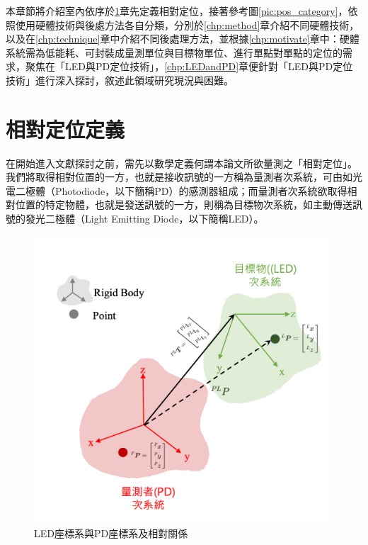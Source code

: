 本章節將介紹室內依序於\ref{chp:relative}章先定義相對定位，接著參考圖\ref{pic:pos_category}，依照使用硬體技術與後處方法各自分類，分別於\ref{chp:method}章介紹不同硬體技術，以及在\ref{chp:technique}章中介紹不同後處理方法，並根據\ref{chp:motivate}章中：硬體系統需為低能耗、可封裝成量測單位與目標物單位、進行單點對單點的定位的需求，聚焦在「LED與PD定位技術」，\ref{chp:LEDandPD}章便針對「LED與PD定位技術」進行深入探討，敘述此領域研究現況與困難。


   





\section{相對定位定義}
\label{chp:relative}

    
    在開始進入文獻探討之前，需先以數學定義何謂本論文所欲量測之「相對定位」。我們將取得相對位置的一方，也就是接收訊號的一方稱為量測者次系統，可由如光電二極體（Photodiode，以下簡稱PD）的感測器組成；而量測者次系統欲取得相對位置的特定物體，也就是發送訊號的一方，則稱為目標物次系統，如主動傳送訊號的發光二極體（Light Emitting Diode，以下簡稱LED）。

    \begin{figure}[htpb]
        \centering
        \includegraphics[width=11cm]{ch2pic/homo_trans.png}
        \caption{LED座標系與PD座標系及相對關係}
        \label{pic:homo_trans}
    \end{figure}


